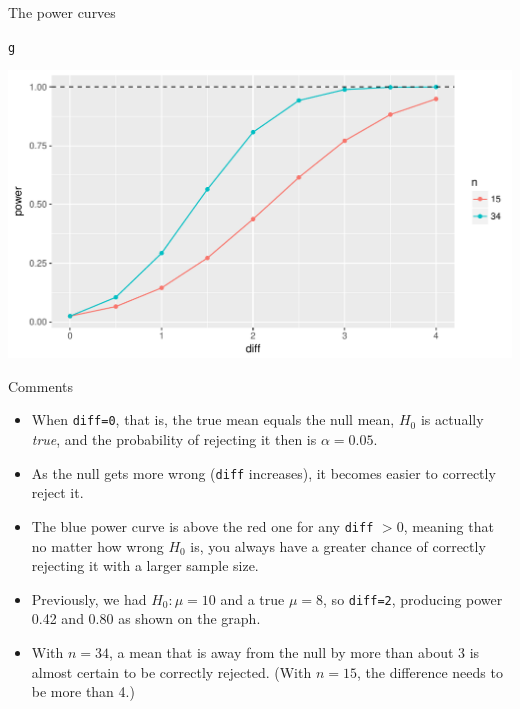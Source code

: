 \documentclass[unknownkeysallowed]{beamer}\usepackage[]{graphicx}\usepackage[]{color}
\makeatletter
\def\maxwidth{ %
  \ifdim\Gin@nat@width>\linewidth
    \linewidth
  \else
    \Gin@nat@width
  \fi
}
\newcommand{\hlstd}[1]{\textcolor[rgb]{0.345,0.345,0.345}{#1}}%
\newenvironment{kframe}{%
 \def\at@end@of@kframe{}%
 \ifinner\ifhmode%
  \def\at@end@of@kframe{\end{minipage}}%
  \begin{minipage}{\columnwidth}%
 \fi\fi%
 \def\FrameCommand##1{\hskip\@totalleftmargin \hskip-\fboxsep
 \colorbox{shadecolor}{##1}\hskip-\fboxsep
     \hskip-\linewidth \hskip-\@totalleftmargin \hskip\columnwidth}%
 \MakeFramed {\advance\hsize-\width
   \@totalleftmargin\z@ \linewidth\hsize
   \@setminipage}}%
 {\par\unskip\endMakeFramed%
 \at@end@of@kframe}
\newenvironment{knitrout}{}{} %
\makeatother
\begin{document}
\begin{frame}[fragile]{The power curves}
  
\begin{knitrout}
\color{fgcolor}\begin{kframe}
\begin{alltt}
\hlstd{g}
\end{alltt}
\end{kframe}
\includegraphics[width=\maxwidth]{figure/unnamed-chunk-78-1} 

\end{knitrout}
\end{frame}

\begin{frame}[fragile]{Comments}
  \begin{itemize}
  \item When \texttt{diff=0}, that is, the true mean equals the null
    mean, $H_0$ is actually \emph{true}, and the probability of
    rejecting it then is $\alpha=0.05$.
  \item As the null gets more wrong (\texttt{diff} increases), it
    becomes easier to correctly reject it.
  \item The blue power curve is above the red one for any
    \texttt{diff} $>0$, meaning that no matter how wrong $H_0$ is, you
    always have a greater chance of correctly rejecting it with a
    larger sample size.
  \item Previously, we had $H_0: \mu=10$ and a true $\mu=8$, so
    \texttt{diff=2}, producing power 0.42 and 0.80 as shown on the
    graph.
  \item With $n=34$, a mean that is away from the null by more than about 3 is
    almost certain to be correctly rejected. (With $n=15$, the
    difference needs to be more than 4.)
  \end{itemize}
\end{frame}
\end{document}
